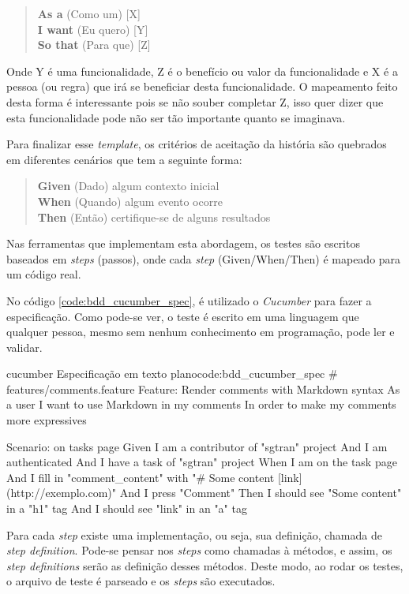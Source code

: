 \begin{quote}
\textbf{As a} (Como um) [X]\\
\textbf{I want} (Eu quero) [Y]\\
\textbf{So that} (Para que) [Z]
\end{quote}

Onde Y é uma funcionalidade, Z é o benefício ou valor da funcionalidade e X é a pessoa (ou regra) que irá se beneficiar desta funcionalidade. O mapeamento feito desta forma é interessante pois se não souber completar Z, isso quer dizer que esta funcionalidade pode não ser tão importante quanto se imaginava.

Para finalizar esse \textit{template}, os critérios de aceitação da história são quebrados em diferentes cenários que tem a seguinte forma:

\begin{quote}
\textbf{Given} (Dado) algum contexto inicial\\
\textbf{When} (Quando) algum evento ocorre\\
\textbf{Then} (Então) certifique-se de alguns resultados
\end{quote}

Nas ferramentas que implementam esta abordagem, os testes são escritos baseados em \textit{steps} (passos), onde cada \textit{step} (Given/When/Then) é mapeado para um código real.

No código \ref{code:bdd_cucumber_spec}, é utilizado o \textit{Cucumber} para fazer a especificação. Como pode-se ver, o teste é escrito em uma linguagem que qualquer pessoa, mesmo sem nenhum conhecimento em programação, pode ler e validar.

\begin{mycode}{cucumber}%
{Especificação em texto plano}{code:bdd_cucumber_spec}
# features/comments.feature
Feature: Render comments with Markdown syntax
  As a user
  I want to use Markdown in my comments
  In order to make my comments more expressives

  Scenario: on tasks page
    Given I am a contributor of "sgtran" project
    And I am authenticated
    And I have a task of "sgtran" project
    When I am on the task page
    And I fill in "comment_content" with "# Some content [link](http://exemplo.com)"
    And I press "Comment"
    Then I should see "Some content" in a "h1" tag
    And I should see "link" in an "a" tag
\end{mycode}

Para cada \textit{step} existe uma implementação, ou seja, sua definição, chamada de \textit{step definition}. Pode-se pensar nos \textit{steps} como chamadas à métodos, e assim, os \textit{step definitions} serão as definição desses métodos. Deste modo, ao rodar os testes, o arquivo de teste é parseado e os \textit{steps} são executados.

